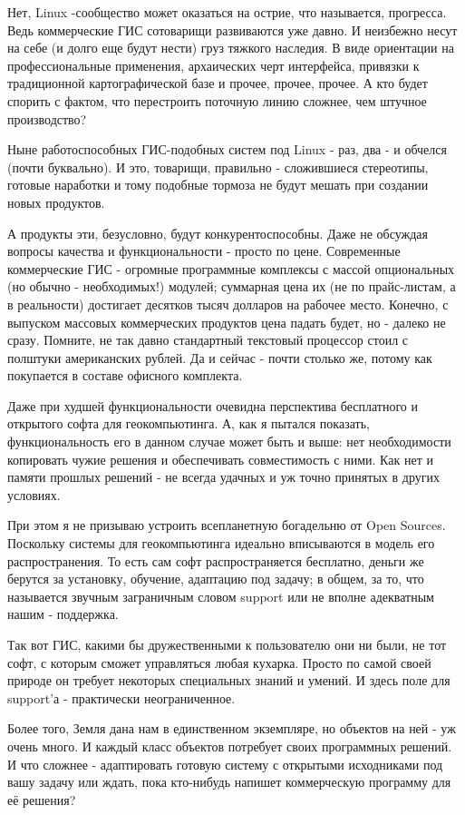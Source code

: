 Нет, Linux -сообщество может оказаться на острие, что называется, прогресса. Ведь коммерческие ГИС сотоварищи развиваются уже давно. И неизбежно несут на себе (и долго еще будут нести) груз тяжкого наследия. В виде ориентации на профессиональные применения, архаических черт интерфейса, привязки к традиционной картографической базе и прочее, прочее, прочее. А кто будет спорить с фактом, что перестроить поточную линию сложнее, чем штучное производство?

Ныне работоспособных ГИС-подобных систем под Linux - раз, два - и обчелся (почти буквально). И это, товарищи, правильно - сложившиеся стереотипы, готовые наработки и тому подобные тормоза не будут мешать при создании новых продуктов.

А продукты эти, безусловно, будут конкурентоспособны. Даже не обсуждая вопросы качества и функциональности - просто по цене. Современные коммерческие ГИС - огромные программные комплексы с массой опциональных (но обычно - необходимых!) модулей; суммарная цена их (не по прайс-листам, а в реальности) достигает десятков тысяч долларов на рабочее место. Конечно, с выпуском массовых коммерческих продуктов цена падать будет, но - далеко не сразу. Помните, не так давно стандартный текстовый процессор стоил с полштуки американских рублей. Да и сейчас - почти столько же, потому как покупается в составе офисного комплекта.

Даже при худшей функциональности очевидна перспектива бесплатного и открытого софта для геокомпьютинга. А, как я пытался показать, функциональность его в данном случае может быть и выше: нет необходимости копировать чужие решения и обеспечивать совместимость с ними. Как нет и памяти прошлых решений - не всегда удачных и уж точно принятых в других условиях.

При этом я не призываю устроить всепланетную богадельню от Open Sources. Поскольку системы для геокомпьютинга идеально вписываются в модель его распространения. То есть сам софт распространяется бесплатно, деньги же берутся за установку, обучение, адаптацию под задачу; в общем, за то, что называется звучным заграничным словом support или не вполне адекватным нашим - поддержка.

Так вот ГИС, какими бы дружественными к пользователю они ни были, не тот софт, с которым сможет управляться любая кухарка. Просто по самой своей природе он требует некоторых специальных знаний и умений. И здесь поле для support'а - практически неограниченное.

Более того, Земля дана нам в единственном экземпляре, но объектов на ней - уж очень много. И каждый класс объектов потребует своих программных решений. И что сложнее - адаптировать готовую систему с открытыми исходниками под вашу задачу или ждать, пока кто-нибудь напишет коммерческую программу для её решения?

